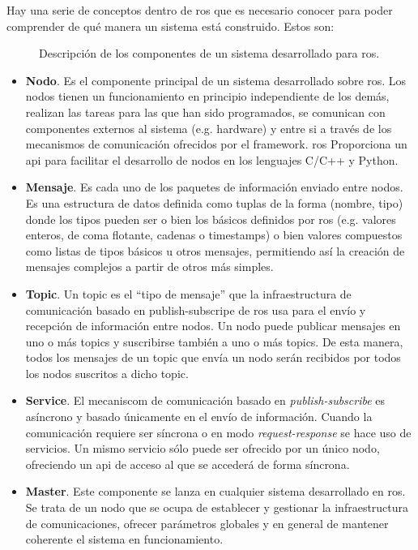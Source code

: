 Hay una serie de conceptos dentro de \ac{ros} que es necesario conocer para poder comprender de qué manera un sistema está construido. Estos son:

\begin{figure*}[t]
	\centering
	\caption{Descripción de los componentes de un sistema desarrollado para \ac{ros}.}
	\label{fig:ros-architecture}
\end{figure*}

\begin{itemize}
	\item \textbf{Nodo}. Es el componente principal de un sistema desarrollado sobre \ac{ros}. Los nodos tienen un funcionamiento en principio independiente de los demás, realizan las tareas para las que han sido programados, se comunican con componentes externos al sistema (e.g. hardware) y entre si a través de los mecanismos de comunicación ofrecidos por el \ac{framework}. \ac{ros} Proporciona un \ac{api} para facilitar el desarrollo de nodos en los lenguajes C/C++ y Python.
	\item \textbf{Mensaje}. Es cada uno de los paquetes de información enviado entre nodos. Es una estructura de datos definida como tuplas de la forma (nombre, tipo) donde los tipos pueden ser o bien los básicos definidos por ros (e.g. valores enteros, de coma flotante, cadenas o timestamps) o bien valores compuestos como listas de tipos básicos u otros mensajes, permitiendo así la creación de mensajes complejos a partir de otros más simples.
	\item \textbf{Topic}. Un topic es el \enquote{tipo de mensaje} que la infraestructura de comunicación basado en publish-subscripe de \ac{ros} usa para el envío y recepción de información entre nodos. Un nodo puede publicar mensajes en uno o más topics y suscribirse también a uno o más topics. De esta manera, todos los mensajes de un topic que envía un nodo serán recibidos por todos los nodos suscritos a dicho topic.
	\item \textbf{Service}. El mecaniscom de comunicación basado en \textit{publish-subscribe} es asíncrono y basado únicamente en el envío de información. Cuando la comunicación requiere ser síncrona o en modo \textit{request-response} se hace uso de servicios. Un mismo servicio sólo puede ser ofrecido por un único nodo, ofreciendo un \ac{api} de acceso al que se accederá de forma síncrona.
	\item \textbf{Master}. Este componente se lanza en cualquier sistema desarrollado en \ac{ros}. Se trata de un nodo que se ocupa de establecer y gestionar la infraestructura de comunicaciones, ofrecer parámetros globales y en general de mantener coherente el sistema en funcionamiento.
\end{itemize}